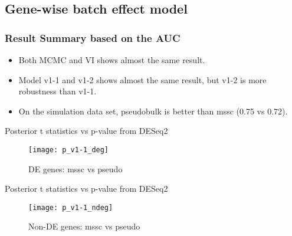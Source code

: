 \subsection*{Gene-wise batch effect model}
\begin{frame}
  \frametitle{Result Summary based on the AUC}
  \begin{itemize}
  \item
    Both MCMC and VI shows almost the same result.
  \item
    Model v1-1 and v1-2 shows almost the same result, but v1-2 is more
    robustness than v1-1.
  \item
    On the simulation data set, pseudobulk is better than mssc (0.75 vs 0.72). 
  \end{itemize}
\end{frame}

\begin{frame}{Posterior t statistics vs p-value from DESeq2}
  \begin{figure}
    \centering
    \texttt{[image: p\_v1-1\_deg]}
    \caption{DE genes: mssc vs pseudo} 
  \end{figure}
\end{frame}

\begin{frame}{Posterior t statistics vs p-value from DESeq2}
  \begin{figure}
    \centering
    \texttt{[image: p\_v1-1\_ndeg]}
    \caption{Non-DE genes: mssc vs pseudo}
  \end{figure}
\end{frame}
